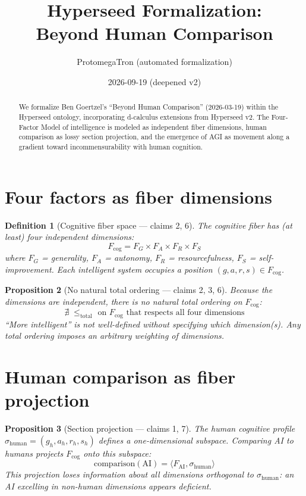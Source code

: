 \documentclass[11pt,a4paper]{article}
\title{Hyperseed Formalization:\\
  Beyond Human Comparison}
\author{ProtomegaTron (automated formalization)}
\date{2026-09-19 (deepened v2)}
\newtheorem{definition}{Definition}[section]
\newtheorem{proposition}[definition]{Proposition}
\begin{document}
\maketitle

\begin{abstract}
We formalize Ben Goertzel's ``Beyond Human Comparison'' (2026-03-19)
within the Hyperseed ontology, incorporating d-calculus extensions from
Hyperseed v2. The Four-Factor Model of intelligence is modeled as
independent fiber dimensions, human comparison as lossy section
projection, and the emergence of AGI as movement along a gradient
toward incommensurability with human cognition.
\end{abstract}

\tableofcontents

\section{Four factors as fiber dimensions}

\begin{definition}[Cognitive fiber space --- claims 2, 6]
The cognitive fiber has (at least) four independent dimensions:
\[
  F_{\text{cog}} = F_G \times F_A \times F_R \times F_S
\]
where $F_G$ = generality, $F_A$ = autonomy, $F_R$ = resourcefulness,
$F_S$ = self-improvement. Each intelligent system occupies a position
$(g, a, r, s) \in F_{\text{cog}}$.
\end{definition}

\begin{proposition}[No natural total ordering --- claims 2, 3, 6]
\label{prop:ordering}
Because the dimensions are independent, there is no natural total
ordering on $F_{\text{cog}}$:
\[
  \nexists\; \leq_{\text{total}} \text{ on } F_{\text{cog}} \text{ that
    respects all four dimensions}
\]
``More intelligent'' is not well-defined without specifying which
dimension(s). Any total ordering imposes an arbitrary weighting of
dimensions.
\end{proposition}

\section{Human comparison as fiber projection}

\begin{proposition}[Section projection --- claims 1, 7]
\label{prop:project}
The human cognitive profile $\sigma_{\text{human}} = (g_h, a_h, r_h, s_h)$
defines a one-dimensional subspace. Comparing AI to humans projects
$F_{\text{cog}}$ onto this subspace:
\[
  \text{comparison}(\text{AI}) = \langle F_{\text{AI}}, \sigma_{\text{human}} \rangle
\]
This projection loses information about all dimensions orthogonal to
$\sigma_{\text{human}}$: an AI excelling in non-human dimensions
appears deficient.
\end{proposition}
\end{document}
